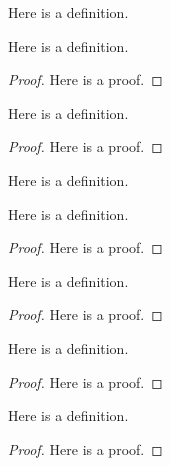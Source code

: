 \begin{lemma}
\begin{definition}\label{utility}
    \leanok
    Here is a definition.
\end{definition}

\begin{lemma}\label{utility_winner}
    \leanok
    Here is a definition.
\end{lemma}
\begin{proof}
    Here is a proof.
\end{proof}

\begin{lemma}\label{utility_loser}
    \leanok
    Here is a definition.
\end{lemma}
\begin{proof}
    Here is a proof.
\end{proof}

\begin{definition}\label{dominant}
    \leanok
    Here is a definition.
\end{definition}


\begin{lemma}\label{gt_wins}
    \leanok
    Here is a definition.
\end{lemma}
\begin{proof}
    Here is a proof.
\end{proof}



\begin{lemma}\label{b_winner_max}
    \leanok
    Here is a definition.
\end{lemma}
\begin{proof}
    Here is a proof.
\end{proof}

\begin{lemma}\label{b_winner}
    \leanok
    Here is a definition.
\end{lemma}
\begin{proof}
    Here is a proof.
\end{proof}

\begin{lemma}\label{b_loser_max}
    \leanok
    Here is a definition.
\end{lemma}
\begin{proof}
    Here is a proof.
\end{proof}


\end{lemma}
